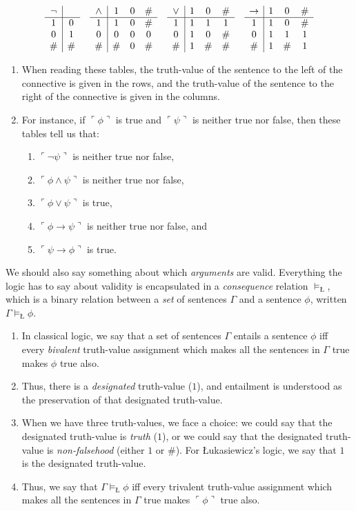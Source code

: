 \documentclass[landscape, two column, full page,reqno]{article}
\newcommand{\qe}{\begin{enumerate}[align=left,style=nextline,leftmargin=17pt,labelsep=5pt,font=\normalfont]}
\newcommand{\e}{\emph}
\newcommand{\ze}{\end{enumerate}}
\newcommand{\p}{\item}
\newcommand{\qq}[1]{ \ulcorner #1 \urcorner}
\begin{document}
	\[
	\begin{array}{c | c}
	\neg	&	\\\hline
	1	&	0	\\
	0	&	1	\\
	\#	&	\#	
	\end{array}
	\quad
	\begin{array}{c | c c c}
	\wedge	&	1	&	0	&	\#	\\\hline
	1		&	1	&	0	&	\#	\\
	0		&	0	&	0	&	0	\\
	\#		&	\#	&	0	&	\#
	\end{array}
	\quad
	\begin{array}{c | c c c}
	\vee		&	1	&	0	&	\#	\\\hline
	1		&	1	&	1	&	1	\\
	0		&	1	&	0	&	\#	\\
	\#		&	1	&	\#	&	\#
	\end{array}
	\quad
	\begin{array}{c | c c c}
	\to		&	1	&	0	&	\#	\\\hline
	1		&	1	&	0	&	\#	\\
	0		&	1	&	1	&	1	\\
	\#		&	1	&	\#	&	1
	\end{array}
	\]
	\qe
	\p When reading these tables, the truth-value of the sentence to the left of the connective is given in the rows, and the truth-value of the sentence to the right of the connective is given in the columns.
	\p For instance, if $\qq{\phi}$ is true and $\qq{\psi}$ is neither true nor false, then these tables tell us that:
		\qe
		\p $\qq{\neg \psi}$ is neither true nor false,
		\p $\qq{\phi \wedge \psi}$ is neither true nor false,
		\p $\qq{\phi \vee \psi}$ is true, 
		\p $\qq{\phi \to \psi}$ is neither true nor false, and
		\p $\qq{\psi \to \phi}$ is true.
		\ze 
	\ze 
\p We should also say something about which \e{arguments} are valid.  Everything the logic has to say about validity is encapsulated in a \e{consequence} relation $\models_{\text{\L}}$, which is a binary relation between a \e{set} of sentences $\Gamma$ and a sentence $\phi$, written ${\Gamma \models_{\text{\L}} \phi}$.
		\qe
		\p In classical logic, we say that a set of sentences $\Gamma$ {entails} a sentence $\phi$ iff every \e{bivalent} truth-value assignment which makes all the sentences in $\Gamma$ true makes $\phi$ true also.
		\p Thus, there is a \e{designated} truth-value ($1$), and entailment is understood as the preservation of that designated truth-value.
		\p When we have three truth-values, we face a choice: we could say that the designated truth-value is \e{truth} ($1$), or we could say that the designated truth-value is \e{non-falsehood} (either $1$ or $\#$).  For \L ukasiewicz's logic, we say that $1$ is the designated truth-value.
		\p Thus, we say that $\Gamma \models_{\text{\L}} \phi$ iff every trivalent truth-value assignment which makes all the sentences in $\Gamma$ true makes $\qq{\phi}$ true  also.
		\ze 
\end{document}
